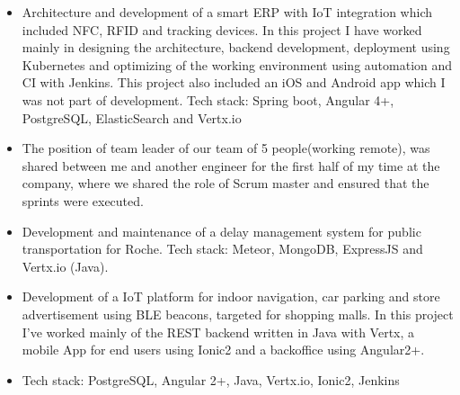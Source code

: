 \documentclass[10pt,a4paper]{altacv}
\begin{document}

\begin{fullwidth}
\makecvheader
\end{fullwidth}


\begin{itemize}
\justifying
\item Architecture and development of a smart ERP with IoT integration which included NFC, RFID and tracking devices. In this project I have worked mainly in designing the architecture, backend development, deployment using Kubernetes and optimizing of the working environment using automation and CI with Jenkins. This project also included an iOS and Android app which I was not part of development.
  Tech stack: Spring boot, Angular 4+, PostgreSQL, ElasticSearch and Vertx.io
\item The position of team leader of our team of 5 people(working remote), was shared between me and another engineer for the first half of my time at the company, where we shared the role of Scrum master and ensured that the sprints were executed.
\item Development and maintenance of a delay management system for public
  transportation for Roche. Tech stack: Meteor, MongoDB,
  ExpressJS and Vertx.io (Java).  
\end{itemize}

\divider

\begin{itemize}
\justifying 
\item Development of a IoT platform for indoor navigation, car parking and store advertisement using BLE beacons, targeted for shopping malls.
In this project I've worked mainly of the REST backend written in Java with Vertx, a mobile App for end users using Ionic2 and a backoffice using Angular2+.  
\item Tech stack: PostgreSQL, Angular 2+, Java, Vertx.io, Ionic2, Jenkins
\end{itemize}
\end{document}

